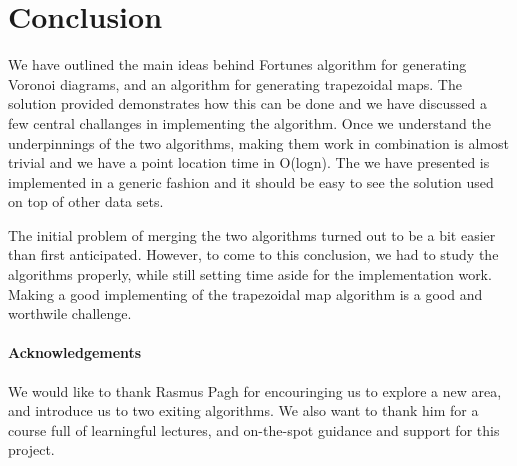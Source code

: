 \section{Conclusion}
We have outlined the main ideas behind Fortunes algorithm for generating Voronoi diagrams, and an algorithm for generating trapezoidal maps. The solution provided demonstrates how this can be done and we have discussed a few central challanges in implementing the algorithm. Once we understand the underpinnings of the two algorithms, making them work in combination is almost trivial and we have a point location time in O(logn). The we have presented is implemented in a generic fashion and it should be easy to see the solution used on top of other data sets.

The initial problem of merging the two algorithms turned out to be a bit easier than first anticipated. However, to come to this conclusion, we had to study the algorithms properly, while still setting time aside for the implementation work. Making a good implementing of the trapezoidal map algorithm is a good and worthwile challenge.  
\paragraph{Acknowledgements}
We would like to thank Rasmus Pagh for encouringing us to explore a new area, and introduce us to two exiting algorithms. We also want to thank him for a course full of learningful lectures, and on-the-spot guidance and support for this project.  
